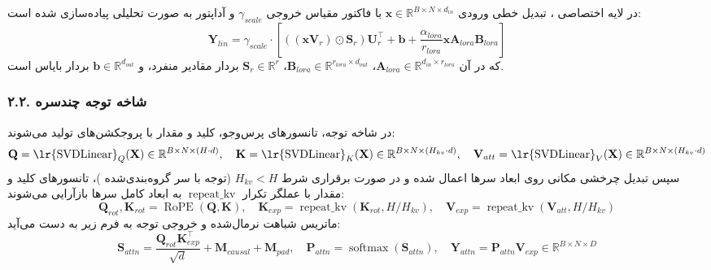 در لایه اختصاصی ، تبدیل خطی ورودی $\mathbf{x} \in \mathbb{R}^{B \times N \times d_{in}}$ با فاکتور مقیاس خروجی $\gamma_{scale}$ و آداپتور  به صورت تحلیلی پیاده‌سازی شده است:
\begin{equation}
\mathbf{Y}_{lin} = \gamma_{scale} \cdot \left[ \left( (\mathbf{x} \mathbf{V}_r) \odot \mathbf{S}_r \right) \mathbf{U}_r^\top + \mathbf{b} + \frac{\alpha_{lora}}{r_{lora}} \mathbf{x} \mathbf{A}_{lora} \mathbf{B}_{lora} \right]
\end{equation}
که در آن $\mathbf{A}_{lora} \in \mathbb{R}^{d_{in} \times r_{lora}}$، $\mathbf{B}_{lora} \in \mathbb{R}^{r_{lora} \times d_{out}}$، $\mathbf{S}_r \in \mathbb{R}^r$ بردار مقادیر منفرد، و $\mathbf{b} \in \mathbb{R}^{d_{out}}$ بردار بایاس است.

\subsubsection*{۲.۲. شاخه توجه چندسره }
در شاخه توجه، تانسورهای پرس‌وجو، کلید و مقدار با پروجکشن‌های  تولید می‌شوند:
\begin{equation}
\mathbf{Q} = \text{\lr{SVDLinear}}_Q(\mathbf{X}) \in \mathbb{R}^{B \times N \times (H \cdot d)}, \quad \mathbf{K} = \text{\lr{SVDLinear}}_K(\mathbf{X}) \in \mathbb{R}^{B \times N \times (H_{kv} \cdot d)}, \quad \mathbf{V}_{att} = \text{\lr{SVDLinear}}_V(\mathbf{X}) \in \mathbb{R}^{B \times N \times (H_{kv} \cdot d)}
\end{equation}
سپس تبدیل چرخشی مکانی  روی ابعاد سرها اعمال شده و در صورت برقراری شرط $H_{kv} < H$ (توجه با سر گروه‌بندی‌شده )، تانسورهای کلید و مقدار با عملگر تکرار $\operatorname{repeat\_kv}$ به ابعاد کامل سرها بازآرایی می‌شوند:
\begin{equation}
\mathbf{Q}_{rot}, \mathbf{K}_{rot} = \operatorname{RoPE}(\mathbf{Q}, \mathbf{K}), \quad \mathbf{K}_{exp} = \operatorname{repeat\_kv}(\mathbf{K}_{rot}, H / H_{kv}), \quad \mathbf{V}_{exp} = \operatorname{repeat\_kv}(\mathbf{V}_{att}, H / H_{kv})
\end{equation}
ماتریس شباهت نرمال‌شده و خروجی توجه به فرم زیر به دست می‌آید:
\begin{equation}
\mathbf{S}_{attn} = \frac{\mathbf{Q}_{rot} \mathbf{K}_{exp}^\top}{\sqrt{d}} + \mathbf{M}_{causal} + \mathbf{M}_{pad}, \quad \mathbf{P}_{attn} = \operatorname{softmax}(\mathbf{S}_{attn}), \quad \mathbf{Y}_{attn} = \mathbf{P}_{attn} \mathbf{V}_{exp} \in \mathbb{R}^{B \times N \times D}
\end{equation}

